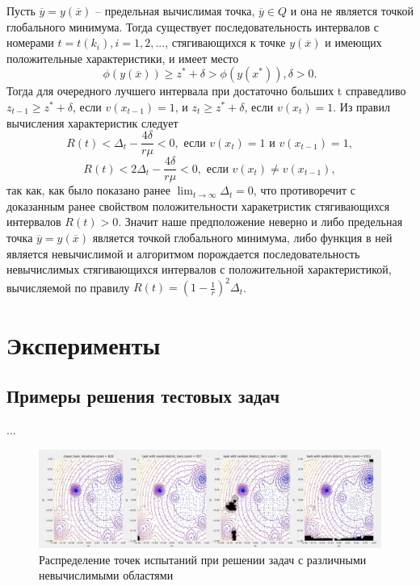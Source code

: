\documentclass[10pt,a4paper]{book}
\begin{document}
Пусть $\overline{y} = y(\overline{x})$ -- предельная вычислимая точка, $\overline{y} \in Q$ и она не является точкой глобального минимума.
Тогда существует последовательность интервалов с номерами $t = t(k_i), i = 1, 2, ...$, стягивающихся к точке $y(\overline{x})$ и имеющих положительные характеристики, и имеет место
\[
\phi(y(\overline{x})) \geq z^* + \delta > \phi(y(x^*)), \delta > 0.
\]
Тогда для очередного лучшего интервала при достаточно больших t справедливо $z_{t-1} \geq z^* + \delta$, если $v(x_{t-1}) = 1$, и $z_{t} \geq z^* + \delta$, если $v(x_{t}) = 1$. 
Из правил вычисления характеристик следует
\[
R(t) < \Delta_t-\frac{4\delta}{r\mu} < 0, \text{ если } v(x_{t}) = 1 \text{ и } v(x_{t-1}) = 1,
\]
\[
R(t) < 2\Delta_t-\frac{4\delta}{r\mu} < 0, \text{ если } v(x_{t}) \neq v(x_{t-1}),
\]
так как, как было показано ранее $\lim_{t \to \infty}{\Delta_t} = 0$, что противоречит с доказанным ранее свойством положительности харакетристик стягивающихся интервалов $R(t) > 0$. Значит наше предположение неверно и либо предельная точка $\overline{y} = y(\overline{x})$ является точкой глобального минимума, либо функция в ней является невычислимой и алгоритмом порождается последовательность невычислимых стягивающихся интервалов с положительной характеристикой, вычисляемой по правилу $R(t) =(1-\frac{1}{r})^2\Delta_t$.

\section{Эксперименты}

\subsection{Примеры решения тестовых задач}

...

\begin{figure}[h]
\includegraphics[width=450pt]{pic/fig_2.jpg}
\caption{Распределение точек испытаний при решении задач с различными невычислимыми областями} \label{fig_2}
\end{figure}
\end{document}
